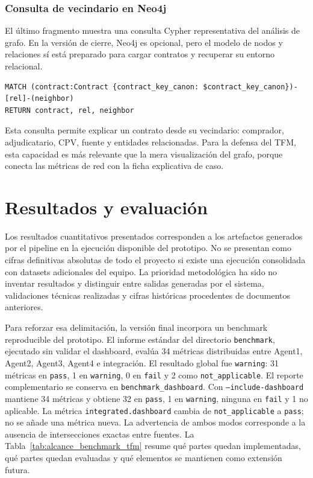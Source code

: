 \documentclass[11pt,a4paper,spanish]{book}
\numberwithin{equation}{chapter}
\numberwithin{figure}{chapter}
\begin{document}
\subsection{Consulta de vecindario en Neo4j}

El {\'u}ltimo fragmento muestra una consulta Cypher representativa del an{\'a}lisis de grafo. En la
versi{\'o}n de cierre, Neo4j es opcional, pero el modelo de nodos y relaciones s{\'i} est{\'a}
preparado para cargar contratos y recuperar su entorno relacional.

\begin{lstlisting}
MATCH (contract:Contract {contract_key_canon: $contract_key_canon})-[rel]-(neighbor)
RETURN contract, rel, neighbor
\end{lstlisting}

Esta consulta permite explicar un contrato desde su vecindario: comprador, adjudicatario, CPV,
fuente y entidades relacionadas. Para la defensa del TFM, esta capacidad es m{\'a}s relevante que la
mera visualizaci{\'o}n del grafo, porque conecta las m{\'e}tricas de red con la ficha explicativa de
caso.

\chapter{Resultados y evaluaci{\'o}n}
\label{cap:resultados_evaluacion}

Los resultados cuantitativos presentados corresponden a los artefactos generados por el pipeline en
la ejecuci{\'o}n disponible del prototipo. No se presentan como cifras definitivas absolutas de todo el
proyecto si existe una ejecuci{\'o}n consolidada con datasets adicionales del equipo. La prioridad
metodol{\'o}gica ha sido no inventar resultados y distinguir entre salidas generadas por el sistema,
validaciones t{\'e}cnicas realizadas y cifras hist{\'o}ricas procedentes de documentos anteriores.

Para reforzar esa delimitaci{\'o}n, la versi{\'o}n final incorpora un benchmark reproducible del
prototipo. El informe est{\'a}ndar del directorio \texttt{benchmark}, ejecutado sin validar el
dashboard, eval{\'u}a 34 m{\'e}tricas distribuidas entre Agent1, Agent2,
Agent3, Agent4 e integraci{\'o}n. El resultado global fue \texttt{warning}: 31 m{\'e}tricas en
\texttt{pass}, 1 en \texttt{warning}, 0 en \texttt{fail} y 2 como \texttt{not\_applicable}. El
reporte complementario se conserva en \texttt{benchmark\_dashboard}. Con
\texttt{--include-dashboard} mantiene 34 m{\'e}tricas y obtiene 32 en \texttt{pass}, 1 en
\texttt{warning}, ninguna en \texttt{fail} y 1 no aplicable. La m{\'e}trica
\texttt{integrated.dashboard} cambia de \texttt{not\_applicable} a \texttt{pass}; no se a{\~n}ade una
m{\'e}trica nueva. La advertencia de ambos modos corresponde a la ausencia de intersecciones exactas
entre fuentes. La Tabla~\ref{tab:alcance_benchmark_tfm} resume qu{\'e} partes quedan implementadas,
qu{\'e} partes quedan evaluadas y qu{\'e} elementos se mantienen como extensi{\'o}n futura.
\end{document}
